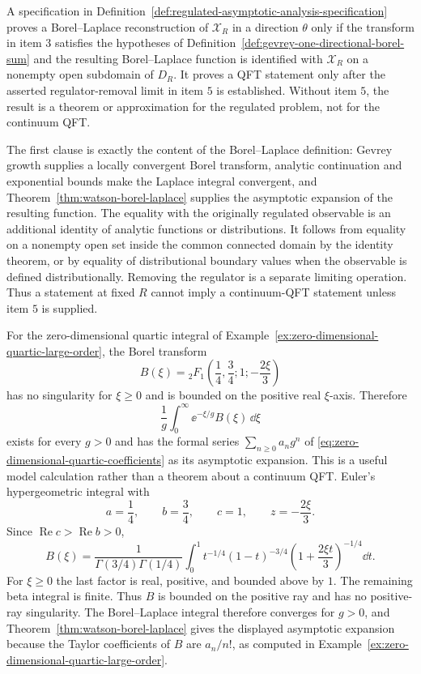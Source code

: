 \begin{remark}
\label{rem:regulated-asymptotic-analysis-status}
A specification in Definition~\ref{def:regulated-asymptotic-analysis-specification} proves a
Borel--Laplace reconstruction of \(\mathcal X_R\) in a direction \(\theta\)
only if the transform in item \(3\) satisfies the hypotheses of
Definition~\ref{def:gevrey-one-directional-borel-sum} and the resulting
Borel--Laplace function is identified with \(\mathcal X_R\) on a nonempty open
subdomain of \(D_R\).  It proves a QFT statement only after the asserted
regulator-removal limit in item \(5\) is established.  Without item \(5\), the
result is a theorem or approximation for the regulated problem, not for the
continuum QFT.
\par
The first clause is exactly the content of the Borel--Laplace definition:
Gevrey growth supplies a locally convergent Borel transform, analytic
continuation and exponential bounds make the Laplace integral convergent, and
Theorem~\ref{thm:watson-borel-laplace} supplies the asymptotic expansion of
the resulting function.  The equality with the originally regulated
observable is an additional identity of analytic functions or distributions.
It follows from equality on a nonempty open set inside the common connected
domain by the identity theorem, or by equality of distributional boundary
values when the observable is defined distributionally.  Removing the regulator
is a separate limiting operation.  Thus a statement at fixed \(R\) cannot imply
a continuum-QFT statement unless item \(5\) is supplied.
\end{remark}

For the zero-dimensional quartic integral of
Example~\ref{ex:zero-dimensional-quartic-large-order}, the Borel transform
\[
  B(\xi)
  =
  {}_2F_1\left(\frac14,\frac34;1;-\frac{2\xi}{3}\right)
\]
has no singularity for \(\xi\ge0\) and is bounded on the positive real
\(\xi\)-axis.  Therefore
\[
  \frac1g\int_0^\infty \ee^{-\xi/g}B(\xi)\,\dd\xi
\]
exists for every \(g>0\) and has the formal series
\(\sum_{n\ge0}a_ng^n\) of
\eqref{eq:zero-dimensional-quartic-coefficients} as its asymptotic expansion.
This is a useful model calculation rather than a theorem about a continuum
QFT.  Euler's hypergeometric integral with
\[
  a=\frac14,\qquad b=\frac34,\qquad c=1,\qquad z=-\frac{2\xi}{3}.
\]
Since \(\operatorname{Re}c>\operatorname{Re}b>0\),
\begin{equation}
  B(\xi)
  =
  \frac{1}{\Gamma(3/4)\Gamma(1/4)}
  \int_0^1
  t^{-1/4}(1-t)^{-3/4}
  \left(1+\frac{2\xi t}{3}\right)^{-1/4}\dd t .
  \label{eq:quartic-borel-euler-representation}
\end{equation}
For \(\xi\ge0\) the last factor is real, positive, and bounded above by
\(1\).  The remaining beta integral is finite.  Thus \(B\) is bounded on the
positive ray and has no positive-ray singularity.  The Borel--Laplace integral
therefore converges for \(g>0\), and
Theorem~\ref{thm:watson-borel-laplace} gives the displayed asymptotic
expansion because the Taylor coefficients of \(B\) are \(a_n/n!\), as computed
in Example~\ref{ex:zero-dimensional-quartic-large-order}.

